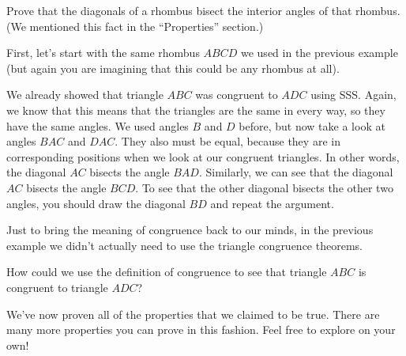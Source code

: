 \documentclass{ximera}
\begin{document}
\begin{example}
Prove that the diagonals of a rhombus bisect the interior angles of that rhombus. (We mentioned this fact in the ``Properties'' section.)

First, let's start with the same rhombus $ABCD$ we used in the previous example (but again you are imagining that this could be any rhombus at all).
\begin{image}\end{image}
We already showed that triangle $ABC$ was congruent to $ADC$ using SSS. Again, we know that this means that the triangles are the same in every way, so they have the same angles. We used angles $B$ and $D$ before, but now take a look at angles $BAC$ and $DAC$. They also must be equal, because they are in corresponding positions when we look at our congruent triangles. In other words, the diagonal $AC$ bisects the angle $BAD$. Similarly, we can see that the diagonal $AC$ bisects the angle $BCD$. To see that the other diagonal bisects the other two angles, you should draw the diagonal $BD$ and repeat the argument.

\end{example}

Just to bring the meaning of congruence back to our minds, in the previous example we didn't actually need to use the triangle congruence theorems.
\begin{question}
How could we use the definition of congruence to see that triangle $ABC$ is congruent to triangle $ADC$?
\begin{multipleChoice}
\end{multipleChoice}
\end{question}

We've now proven all of the properties that we claimed to be true. There are many more properties you can prove in this fashion. Feel free to explore on your own!
\end{document}
